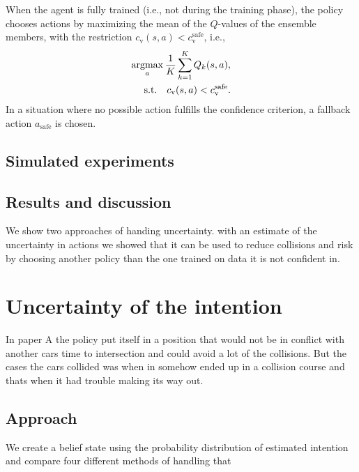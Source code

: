 
When the agent is fully trained (i.e., not during the training phase), the policy chooses actions by maximizing the mean of the $Q$-values of the ensemble members, with the restriction $c_\mathrm{v}(s,a) < c_\mathrm{v}^\mathrm{safe}$, i.e.,
%
\begin{equation}
	\begin{aligned}
		\operatorname*{argmax}_{a} \frac{1}{K} \sum_{k=1}^K Q_k(s,a),\\
		\textrm{s.t.} \quad c_\mathrm{v}(s,a) < c_\mathrm{v}^\mathrm{safe}.
	\end{aligned}
\end{equation}
%
In a situation where no possible action fulfills the confidence criterion, a fallback action $a_\mathrm{safe}$ is chosen.



\subsection{Simulated experiments}

\subsection{Results and discussion}
We show two approaches of handing uncertainty. with an estimate of the uncertainty in actions we showed that it can be used to reduce collisions and risk by choosing another policy than the one trained on data it is not confident in. 


\section{Uncertainty of the intention}
In paper A the policy put itself in a position that would not be in conflict with another cars time to intersection and could avoid a lot of the collisions. But the cases the cars collided was when in somehow ended up in a collision course and thats when it had trouble making its way out. 

\subsection{Approach}
We create a belief state using the probability distribution of estimated intention and compare four different methods of handling that 

